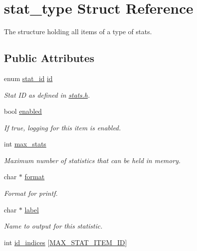 \hypertarget{structstat__type}{\section{stat\-\_\-type Struct Reference}
\label{structstat__type}
}


The structure holding all items of a type of stats.  


\subsection*{Public Attributes}
\begin{DoxyCompactItemize}
\item 
enum \hyperlink{stat__ids_8h_ac210bd14ba53357098c0b3ebdd69784e}{stat\-\_\-id} \hyperlink{structstat__type_a6ad1dba35c226756f00d7d14f4615d8a}{id}
\begin{DoxyCompactList}\small\item\em Stat I\-D as defined in \hyperlink{stats_8h}{stats.\-h}. \end{DoxyCompactList}\item 
bool \hyperlink{structstat__type_a3c657ea7ad6abd10ce5f50feafd7dae0}{enabled}
\begin{DoxyCompactList}\small\item\em If true, logging for this item is enabled. \end{DoxyCompactList}\item 
int \hyperlink{structstat__type_aa53de19c795fd6100739929a37000248}{max\-\_\-stats}
\begin{DoxyCompactList}\small\item\em Maximum number of statistics that can be held in memory. \end{DoxyCompactList}\item 
char $\ast$ \hyperlink{structstat__type_afb56fba8ca558f25ae9e89192430381e}{format}
\begin{DoxyCompactList}\small\item\em Format for printf. \end{DoxyCompactList}\item 
char $\ast$ \hyperlink{structstat__type_a4859052f95e109f5fef80c48883707c9}{label}
\begin{DoxyCompactList}\small\item\em Name to output for this statistic. \end{DoxyCompactList}\item 
int \hyperlink{structstat__type_a8960781cdec87c113b60ddf11dd4fab2}{id\-\_\-indices} \mbox{[}\hyperlink{stats_8h_afc5ce879c3857f15d5956b09c8aad809}{M\-A\-X\-\_\-\-S\-T\-A\-T\-\_\-\-I\-T\-E\-M\-\_\-\-I\-D}\mbox{]}

\end{DoxyCompactItemize}
